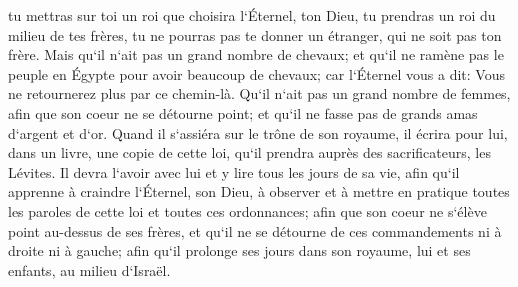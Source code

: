 \verse tu mettras sur toi un roi que choisira l`Éternel, ton Dieu, tu prendras un roi du milieu de tes frères, tu ne pourras pas te donner un étranger, qui ne soit pas ton frère. 
\verse Mais qu`il n`ait pas un grand nombre de chevaux; et qu`il ne ramène pas le peuple en Égypte pour avoir beaucoup de chevaux; car l`Éternel vous a dit: Vous ne retournerez plus par ce chemin-là. 
\verse Qu`il n`ait pas un grand nombre de femmes, afin que son coeur ne se détourne point; et qu`il ne fasse pas de grands amas d`argent et d`or. 
\verse Quand il s`assiéra sur le trône de son royaume, il écrira pour lui, dans un livre, une copie de cette loi, qu`il prendra auprès des sacrificateurs, les Lévites. 
\verse Il devra l`avoir avec lui et y lire tous les jours de sa vie, afin qu`il apprenne à craindre l`Éternel, son Dieu, à observer et à mettre en pratique toutes les paroles de cette loi et toutes ces ordonnances; 
\verse afin que son coeur ne s`élève point au-dessus de ses frères, et qu`il ne se détourne de ces commandements ni à droite ni à gauche; afin qu`il prolonge ses jours dans son royaume, lui et ses enfants, au milieu d`Israël. 

